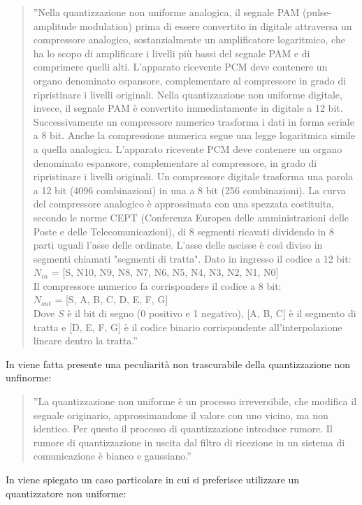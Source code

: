 \documentclass[a4paper]{report} %
\begin{document}
\begin{quote}	
	''Nella quantizzazione non uniforme analogica, il segnale PAM (pulse-amplitude modulation) prima di essere convertito in digitale attraversa un compressore analogico, sostanzialmente un amplificatore logaritmico, che ha lo scopo di amplificare i livelli più bassi del segnale PAM e di comprimere quelli alti. 
	L'apparato ricevente PCM deve contenere un organo denominato espansore, complementare al compressore in grado di ripristinare i livelli originali. Nella quantizzazione non uniforme digitale, invece, il segnale PAM è convertito immediatamente in digitale a 12 bit. Successivamente un compressore numerico trasforma i dati in forma seriale a 8 bit. 
	Anche la compressione numerica segue una legge logaritmica simile a quella analogica. L'apparato ricevente PCM deve contenere un organo denominato espansore, complementare al compressore, in grado di ripristinare i livelli originali. Un compressore digitale trasforma una parola a 12 bit (4096 combinazioni) in una a 8 bit (256 combinazioni). La curva del compressore analogico è approssimata con una spezzata costituita, secondo le norme CEPT (Conferenza Europea delle amministrazioni delle Poste e delle Telecomunicazioni), di 8 segmenti ricavati dividendo in 8 parti uguali l'asse delle ordinate. L'asse delle ascisse è così diviso in segmenti chiamati "segmenti di tratta". 
	Dato in ingresso il codice a 12 bit: \\
	$N_{in}$ = [S, N10, N9, N8, N7, N6, N5, N4, N3, N2, N1, N0] \\
	Il compressore numerico fa corrispondere il codice a 8 bit: \\
	$N_{out}$ = [S, A, B, C, D, E, F, G] \\
	Dove $S$ è il bit di segno (0 positivo e 1 negativo), [A, B, C] è il segmento di tratta e [D, E, F, G] è il codice binario corrispondente all'interpolazione lineare dentro la tratta.'' 
\end{quote}
In \cite{art:rif.6} viene fatta presente una peculiarità non trascurabile della quantizzazione non unfinorme:
\begin{quote}
	''La quantizzazione non uniforme è un processo irreversibile, che modifica il segnale originario, approssimandone il valore con uno vicino, ma non identico. Per questo il processo di quantizzazione introduce rumore. Il rumore di quantizzazione in uscita dal filtro di ricezione in un sistema di comunicazione è bianco e gaussiano.'' 
\end{quote}
In \cite{art:rif.7} viene spiegato un caso particolare in cui si preferisce utilizzare un quantizzatore non uniforme:
\end{document}
